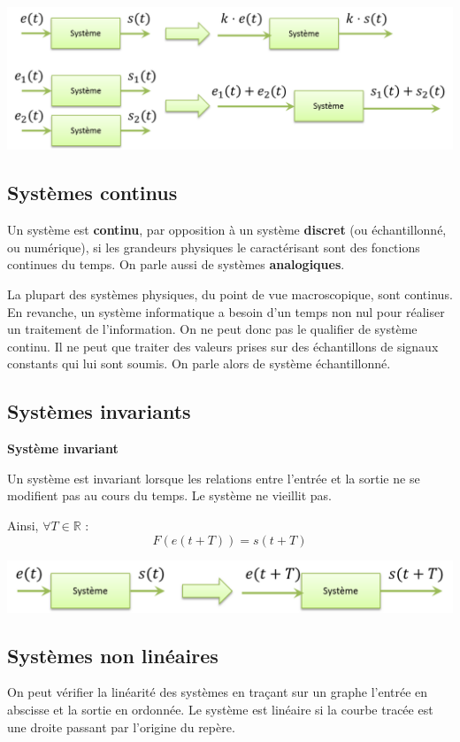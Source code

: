 \documentclass[11pt,oneside]{article}
\begin{document}
\begin{center}
\includegraphics[width=.7\textwidth]{png/lineaire}
\end{center}

\subsection{Systèmes continus}
Un système est \textbf{continu}, par opposition à un système \textbf{discret} (ou
échantillonné, ou numérique), si les grandeurs physiques le caractérisant sont
des fonctions continues du temps. On parle aussi de systèmes
\textbf{analogiques}. 

La plupart des systèmes physiques, du point de vue macroscopique, sont
continus. En revanche, un système informatique a besoin d'un temps non nul pour
réaliser un traitement de l'information. On ne peut donc pas le qualifier de
système continu. Il ne peut que traiter des valeurs prises sur des échantillons
de signaux constants qui lui sont soumis. On parle alors de système
échantillonné.

\subsection{Systèmes invariants}
\begin{defi}
\textbf{Système invariant}

Un système est invariant lorsque les relations entre l'entrée et la sortie ne
se modifient pas au cours du temps. Le système ne vieillit pas. 

Ainsi, $\forall T \in \mathbb{R}$ :
$$
F(e(t+T))=s(t+T)
$$
\end{defi}

\begin{center}
\includegraphics[width=.7\textwidth]{png/invariant}
\end{center}

\subsection{Systèmes non linéaires}
On peut vérifier la linéarité des systèmes en traçant sur un graphe l'entrée en abscisse et la sortie en ordonnée. Le système est linéaire si la courbe tracée est une droite passant par l'origine du repère.
\end{document}
